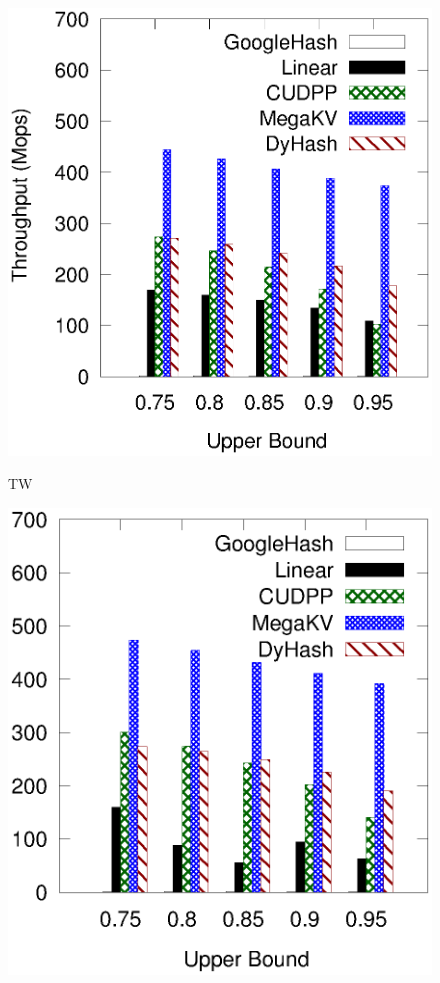 \begin{figure}[t]
	\begin{minipage}{0.19\linewidth}\centering
		\includegraphics[width=\linewidth]{pic/static-upper/upper_insert_twitter.eps}
		\centerline{TW}
	\end{minipage}
	\hfill
	\begin{minipage}{0.19\linewidth}\centering
		\includegraphics[width=\linewidth]{pic/static-upper/upper_insert_reddit.eps}

\end{minipage}
\end{figure}
